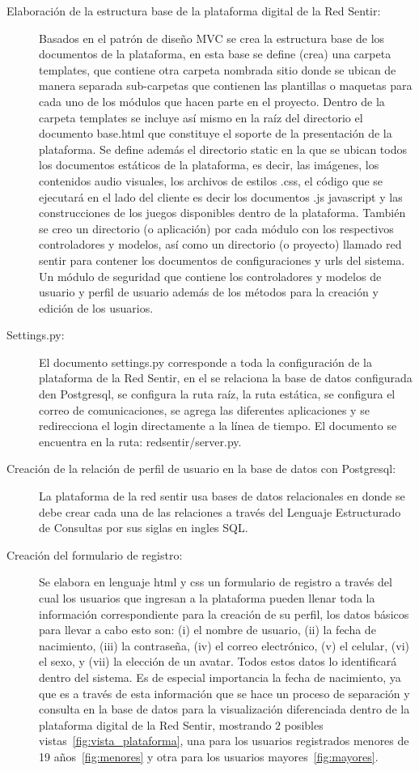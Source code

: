 \documentclass[a4paper]{article}
\begin{document}
\begin{description} 
\item[Elaboración de la estructura base de la plataforma digital de la Red Sentir:] Basados en el patrón de diseño MVC se crea la estructura base de los documentos de la plataforma, en esta base se define (crea) una carpeta templates, que contiene otra carpeta nombrada sitio donde se ubican de manera separada sub-carpetas que contienen las plantillas o maquetas para cada uno de los módulos que hacen parte en el proyecto. Dentro de la carpeta templates se incluye así mismo en la raíz del directorio el documento base.html que constituye el soporte de la presentación de la plataforma. Se define además el directorio static en la que se ubican todos los documentos estáticos de la plataforma, es decir, las imágenes, los contenidos audio visuales, los archivos de estilos .css, el código que se ejecutará en el lado del cliente es decir los documentos .js javascript y las construcciones de los juegos disponibles dentro de la plataforma. También se creo un directorio (o aplicación) por cada módulo con los respectivos controladores y modelos, así como un directorio (o proyecto) llamado red sentir para contener los documentos de configuraciones y urls del sistema. Un módulo de seguridad que contiene los controladores y modelos de usuario y perfil de usuario además de los métodos para la creación y edición de los usuarios.

\item[Settings.py:] El documento settings.py corresponde a toda la configuración de la plataforma de la Red Sentir, en el se relaciona la base de datos configurada den Postgresql, se configura la ruta raíz, la ruta estática, se configura el correo de comunicaciones, se agrega las diferentes aplicaciones y se redirecciona el login directamente a la línea de tiempo. El documento se encuentra en la ruta: redsentir/server.py.

\item[Creación de la relación de perfil de usuario en la base de datos con Postgresql:] La plataforma de la red sentir usa bases de datos relacionales en donde se debe crear cada una de las relaciones a través del Lenguaje Estructurado de Consultas por sus siglas en ingles SQL.

\item[Creación del formulario de registro:] Se elabora en lenguaje html y css un formulario de registro a través del cual los usuarios que ingresan a la plataforma pueden llenar toda la información correspondiente para la creación de su perfil, los datos básicos para llevar a cabo esto son: (i) el nombre de usuario, (ii) la fecha de nacimiento, (iii) la contraseña, (iv) el correo electrónico, (v) el celular, (vi) el sexo, y (vii) la elección de un avatar. Todos estos datos lo identificará dentro del sistema. Es de especial importancia la fecha de nacimiento, ya que es a través de esta información que se hace un proceso de separación y consulta en la base de datos para la visualización diferenciada dentro de la plataforma digital de la Red Sentir, mostrando $2$ posibles vistas~\ref{fig:vista_plataforma}, una para los usuarios registrados menores de 19 años~\ref{fig:menores} y otra para los usuarios mayores~\ref{fig:mayores}.


\end{description}
\end{document}
